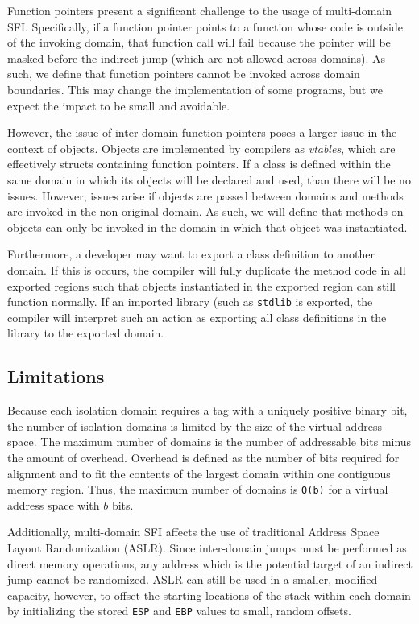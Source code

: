 \documentclass[12pt]{article}
\begin{document}
Function pointers present a significant challenge to the usage of multi-domain SFI. Specifically, if a function pointer points to a function whose code is outside of the invoking domain, that function call will fail because the pointer will be masked before the indirect jump (which are not allowed across domains). As such, we define that function pointers cannot be invoked across domain boundaries. This may change the implementation of some programs, but we expect the impact to be small and avoidable.

However, the issue of inter-domain function pointers poses a larger issue in the context of objects. Objects are implemented by compilers as \textit{vtables}, which are effectively structs containing function pointers. If a class is defined within the same domain in which its objects will be declared and used, than there will be no issues. However, issues arise if objects are passed between domains and methods are invoked in the non-original domain. As such, we will define that methods on objects can only be invoked in the domain in which that object was instantiated.

Furthermore, a developer may want to export a class definition to another domain. If this is occurs, the compiler will fully duplicate the method code in all exported regions such that objects instantiated in the exported region can still function normally. If an imported library (such as \texttt{stdlib} is exported, the compiler will interpret such an action as exporting all class definitions in the library to the exported domain.

\subsection{Limitations}

Because each isolation domain requires a tag with a uniquely positive binary bit, the number of isolation domains is limited by the size of the virtual address space. The maximum number of domains is the number of addressable bits minus the amount of overhead. Overhead is defined as the number of bits required for alignment and to fit the contents of the largest domain within one contiguous memory region. Thus, the maximum number of domains is \texttt{O(b)} for a virtual address space with $b$ bits.

Additionally, multi-domain SFI affects the use of traditional Address Space Layout Randomization (ASLR). Since inter-domain jumps must be performed as direct memory operations, any address which is the potential target of an indirect jump cannot be randomized. ASLR can still be used in a smaller, modified capacity, however, to offset the starting locations of the stack within each domain by initializing the stored \texttt{ESP} and \texttt{EBP} values to small, random offsets.
\end{document}
